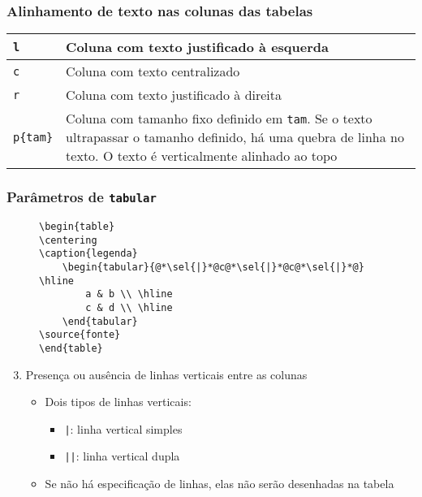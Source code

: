 \begin{frame}[fragile] \frametitle{Alinhamento de texto nas colunas das tabelas}

\begin{table}[!t]
\begin{tabular}{l|p{9cm}} \hline
\texttt{l}			& Coluna com texto justificado à esquerda \\ \hline
\texttt{c}			& Coluna com texto centralizado \\ \hline
\texttt{r}			& Coluna com texto justificado à direita \\ \hline
\texttt{p\{tam\}}	& Coluna com tamanho fixo definido em \texttt{tam}. Se o texto ultrapassar o tamanho definido, há uma quebra de linha no texto. O texto é verticalmente alinhado ao topo \\ \hline
\end{tabular}
\end{table}
\end{frame}

\begin{frame}[fragile] \frametitle{Parâmetros de \texttt{tabular}}
\begin{figure}[!t]
\begin{lstlisting}
\begin{table}
\centering
\caption{legenda}
	\begin{tabular}{@*\sel{|}*@c@*\sel{|}*@c@*\sel{|}*@} \hline
		a & b \\ \hline
		c & d \\ \hline
	\end{tabular}
\source{fonte}
\end{table}
\end{lstlisting}
\end{figure}

\begin{enumerate}
	\setcounter{enumi}{2}
	\item Presença ou ausência de linhas verticais entre as colunas
	\begin{itemize}
		\item Dois tipos de linhas verticais:
		\begin{itemize}
			\item \texttt{|}: linha vertical simples
			\item \texttt{||}: linha vertical dupla
		\end{itemize}
		\item Se não há especificação de linhas, elas não serão desenhadas na tabela
	\end{itemize}
\end{enumerate}
\end{frame}

